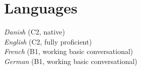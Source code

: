 \documentclass[11pt, a4paper]{article}
\begin{document}
\section*{Languages}
\emph{Danish} (C2, native)\\
\emph{English} (C2, fully proficient)\\
\emph{French} (B1, working basic conversational) \\
\emph{German} (B1, working basic conversational)

\pagebreak
\begin{comment}
\section*{References}
The following professionals kindly offered their availability for personal
references and questions:
\begin{enumerate}
\item Jesper Mogensen, Professor, Unit for Cognitive Neuroscience, Copenhagen University 
\\ Email: \texttt{jesper.mogensen@psy.ku.dk}
\\ Phone: \texttt{(+45) 3532 4873}
\item Lars Bogetoft, Head of IT Program, Copenhagen Business Academy (former)
\\ Email: \texttt{lars.bogetoft@gmail.com}
\\ Phone: \texttt{(+45) 5185 0497}
\item Kevin Lee, CEO, Mobilized Construction
\\ Email: \texttt{kevin@mobilizedconstruction.com}
\\ Phone: \texttt{(+44) 794 046 3174}
\end{enumerate}
\end{comment}
\end{document}
